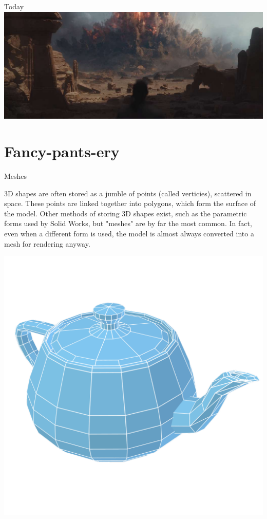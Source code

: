 \documentclass{lug}
\newcommand{\splitslide}[4]{
    \noindent
    \begin{minipage}{#1 \textwidth - #2 }
        #3
    \end{minipage}%
    \hspace{ \dimexpr #2 * 2 \relax }%
    \begin{minipage}{\textwidth - #1 \textwidth - #2 }
        #4
    \end{minipage}
}
\begin{document}
\begin{frame}{Today}
{        \includegraphics[width=\textwidth]{graphics/rogue_one_boom}
    }
\end{frame}

\section{Fancy-pants-ery}

\begin{frame}{Meshes}
    \splitslide{0.65}{.7em}{
        \small

        3D shapes are often stored as a jumble of points (called verticies),
        scattered in space. These points are linked together into polygons,
        which form the surface of the model. Other methods of storing 3D
        shapes exist, such as the parametric forms used by Solid Works, but
        "meshes" are by far the most common. In fact, even when a different
        form is used, the model is almost always converted into a mesh for
        rendering anyway.

    }{
        \includegraphics[width=\textwidth]{graphics/teapot_mesh}
    }
\end{frame}
\end{document}
